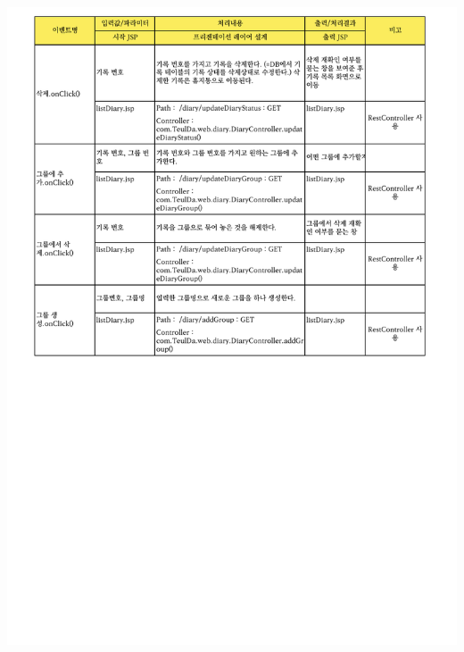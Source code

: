 {{{{{{{{{{{{{{{{{\includegraphics[width=20cm]{./Figure/Analysis/Display/diary/diary_16.pdf} \\
}}}}}}}}}}}}}}}}}
